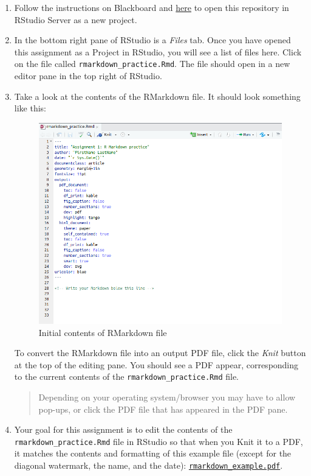 \documentclass[
]{article}
\begin{document}
\begin{enumerate}
\def\labelenumi{\arabic{enumi}.}
\item
  Follow the instructions on Blackboard and
  \href{https://book.cds101.com/using-rstudio-server-to-clone-a-github-repo-as-a-new-project.html}{here}
  to open this repository in RStudio Server as a new project.
\item
  In the bottom right pane of RStudio is a \emph{Files} tab. Once you
  have opened this assignment as a Project in RStudio, you will see a
  list of files here. Click on the file called
  \texttt{rmarkdown\_practice.Rmd}. The file should open in a new editor
  pane in the top right of RStudio.
\item
  Take a look at the contents of the RMarkdown file. It should look
  something like this:

  \begin{figure}
  \centering
  \includegraphics{img/rmd-starter-file.png}
  \caption{Initial contents of RMarkdown file}
  \end{figure}

  To convert the RMarkdown file into an output PDF file, click the
  \emph{Knit} button at the top of the editing pane. You should see a
  PDF appear, corresponding to the current contents of the
  \texttt{rmarkdown\_practice.Rmd} file.

  \begin{quote}
  Depending on your operating system/browser you may have to allow
  pop-ups, or click the PDF file that has appeared in the PDF pane.
  \end{quote}
\item
  Your goal for this assignment is to edit the contents of the
  \texttt{rmarkdown\_practice.Rmd} file in RStudio so that when you Knit
  it to a PDF, it matches the contents and formatting of this example
  file (except for the diagonal watermark, the name, and the date):
  \href{https://gmuedu-my.sharepoint.com/:b:/g/personal/dwhite34_gmu_edu/ESKWurLFXaFKnqnAo-krkXEBPP6h7gz9Fe-JIVPJCjzEhg?e=92BgLP}{\texttt{rmarkdown\_example.pdf}}.


\end{enumerate}
\end{document}
